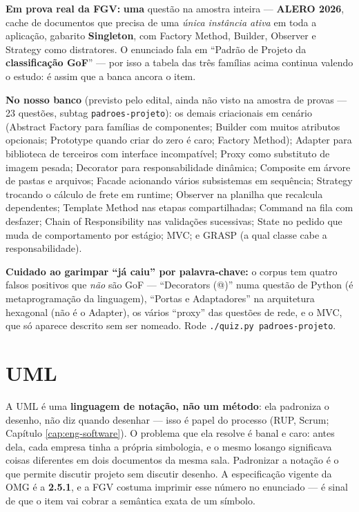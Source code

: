 \begin{jacaiu}
\textbf{Em prova real da FGV:} \textbf{uma} questão na amostra inteira ---
\textbf{ALERO 2026}, cache de documentos que precisa de uma \emph{única
instância ativa} em toda a aplicação, gabarito \textbf{Singleton}, com Factory
Method, Builder, Observer e Strategy como distratores. O enunciado fala em
``Padrão de Projeto da \textbf{classificação GoF}'' --- por isso a tabela das
três famílias acima continua valendo o estudo: é assim que a banca ancora o
item.

\textbf{No nosso banco} (previsto pelo edital, ainda não visto na amostra de
provas --- 23 questões, subtag \texttt{padroes-projeto}): os demais
criacionais em cenário (Abstract Factory para famílias de componentes; Builder
com muitos atributos opcionais; Prototype quando criar do zero é caro; Factory
Method); Adapter para biblioteca de terceiros com interface incompatível;
Proxy como substituto de imagem pesada; Decorator para responsabilidade
dinâmica; Composite em árvore de pastas e arquivos; Facade acionando vários
subsistemas em sequência; Strategy trocando o cálculo de frete em runtime;
Observer na planilha que recalcula dependentes; Template Method nas etapas
compartilhadas; Command na fila com desfazer; Chain of Responsibility nas
validações sucessivas; State no pedido que muda de comportamento por estágio;
MVC; e GRASP (a qual classe cabe a responsabilidade).

\textbf{Cuidado ao garimpar ``já caiu'' por palavra-chave:} o corpus tem
quatro falsos positivos que \emph{não} são GoF --- ``Decorators (@)'' numa
questão de Python (é metaprogramação da linguagem), ``Portas e Adaptadores''
na arquitetura hexagonal (não é o Adapter), os vários ``proxy'' das questões
de rede, e o MVC, que só aparece descrito sem ser nomeado. Rode
\texttt{./quiz.py padroes-projeto}.
\end{jacaiu}

\section{UML}
\label{sec:uml}

A UML é uma \textbf{linguagem de notação, não um método}: ela padroniza o
desenho, não diz quando desenhar --- isso é papel do processo (RUP, Scrum;
Capítulo \ref{cap:eng-software}). O problema que ela resolve é banal e caro:
antes dela, cada empresa tinha a própria simbologia, e o mesmo losango
significava coisas diferentes em dois documentos da mesma sala. Padronizar a
notação é o que permite discutir projeto sem discutir desenho. A especificação
vigente da OMG é a \textbf{2.5.1}, e a FGV costuma imprimir esse número no
enunciado --- é sinal de que o item vai cobrar a semântica exata de um símbolo.

